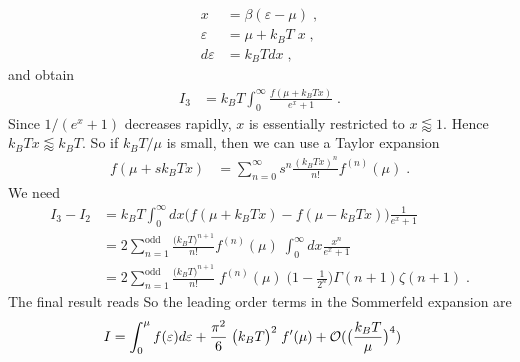 \begin{align*}
x &= \beta(\varepsilon-\mu)\;,\\
\varepsilon &= \mu+ k_{B}T \;x\;,\\
d\varepsilon &= k_{B}T d x\;,
\end{align*}
%
and obtain
%
\begin{align*}
I_{3}&= k_{B}T\int_{0}^{\infty} \frac{f(\mu+k_{B}T x)}{e^{x}+1}\;.
\end{align*}
%
Since $1/(e^{x}+1)$ decreases rapidly, $x$ is essentially restricted to $x\lessapprox 1$. 
Hence $k_{B}T x\lessapprox k_{B}T$. So if $k_{B}T/\mu$ is small, then we can use a Taylor expansion
%
\begin{align*}
f(\mu+ s k_{B}T x) &= \sum_{n=0}^{\infty} s^{n}\frac{(k_{B}T x)^{n}}{n!} f^{(n)}(\mu)\;.
\end{align*}
%
We need 
%
\begin{align*}
I_{3}-I_{2} &=k_{B}T\int_{0}^{\infty}dx 
\bigg( f(\mu+k_{B}Tx) - f(\mu-k_{B}Tx) \bigg)\frac{1}{e^{x}+1}\\
 &=2  \sum_{n=1}^{\text{odd}}
\frac{\big(k_{B}T\big)^{n+1}}{n!} f^{(n)}(\mu)\;
\int_{0}^{\infty}dx
 \frac{x^{n}}{e^{x}+1}\\
  &=2  \sum_{n=1}^{\text{odd}}
\frac{\big(k_{B}T\big)^{n+1}}{n!}\;f^{(n)}(\mu)\;
\big(1-\frac{1}{2^{n}}\big)\Gamma(n+1)\zeta(n+1)\;.
\end{align*}
%
The final result reads
%
%
So the leading order terms in the Sommerfeld expansion are
%
\begin{align*}
I &= \int_{0}^{\mu} f(\varepsilon) d\varepsilon +  \frac{\pi^{2}}{6}\;\big(k_{B}T\big)^{2} \;f'(\mu)+ {\cal O}(\big(\frac{k_{B}T}{\mu}\big)^{4})
\end{align*}
%
